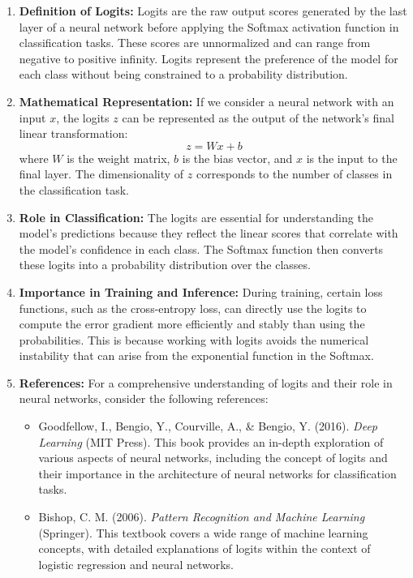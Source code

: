 \begin{enumerate}
    \item \textbf{Definition of Logits:}
    Logits are the raw output scores generated by the last layer of a neural network before applying the Softmax activation function in classification tasks. These scores are unnormalized and can range from negative to positive infinity. Logits represent the preference of the model for each class without being constrained to a probability distribution.

    \item \textbf{Mathematical Representation:}
    If we consider a neural network with an input $x$, the logits $z$ can be represented as the output of the network's final linear transformation:
    \[
    z = Wx + b
    \]
    where $W$ is the weight matrix, $b$ is the bias vector, and $x$ is the input to the final layer. The dimensionality of $z$ corresponds to the number of classes in the classification task.

    \item \textbf{Role in Classification:}
    The logits are essential for understanding the model's predictions because they reflect the linear scores that correlate with the model's confidence in each class. The Softmax function then converts these logits into a probability distribution over the classes.

    \item \textbf{Importance in Training and Inference:}
    During training, certain loss functions, such as the cross-entropy loss, can directly use the logits to compute the error gradient more efficiently and stably than using the probabilities. This is because working with logits avoids the numerical instability that can arise from the exponential function in the Softmax.

    \item \textbf{References:}
    For a comprehensive understanding of logits and their role in neural networks, consider the following references:
    \begin{itemize}
        \item Goodfellow, I., Bengio, Y., Courville, A., \& Bengio, Y. (2016). \textit{Deep Learning} (MIT Press). This book provides an in-depth exploration of various aspects of neural networks, including the concept of logits and their importance in the architecture of neural networks for classification tasks.
        \item Bishop, C. M. (2006). \textit{Pattern Recognition and Machine Learning} (Springer). This textbook covers a wide range of machine learning concepts, with detailed explanations of logits within the context of logistic regression and neural networks.
    \end{itemize}
\end{enumerate}

